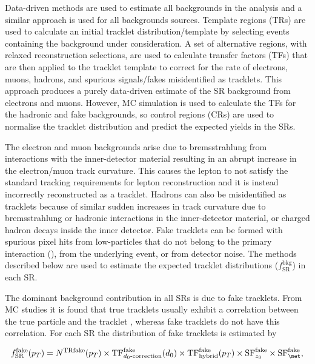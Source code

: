 Data-driven methods are used to estimate all backgrounds in the analysis and a similar approach is used for all backgrounds sources. Template regions (TRs) are used to calculate an initial tracklet \pt distribution/template by selecting events containing the background under consideration. A set of alternative regions, with relaxed reconstruction selections, are used to calculate transfer factors (TFs) that are then applied to the tracklet \pt template to correct for the rate of electrons, muons, hadrons, and spurious signals/fakes misidentified as tracklets. This approach produces a purely data-driven estimate of the SR background from electrons and muons. However, MC simulation is used to calculate the TFs for the hadronic and fake backgrounds, so control regions (CRs) are used to normalise the tracklet \pt distribution and predict the expected yields in the SRs.

The electron and muon backgrounds arise due to bremsstrahlung from interactions with the inner-detector material resulting in an abrupt increase in the electron/muon track curvature. This causes the lepton to not satisfy the standard tracking requirements for lepton reconstruction and it is instead incorrectly reconstructed as a tracklet. Hadrons can also be misidentified as tracklets because of similar sudden increases in track curvature due to bremsstrahlung or hadronic interactions in the inner-detector material, or charged hadron decays inside the inner detector. Fake tracklets can be formed with spurious pixel hits from low-\pt particles that do not belong to the primary interaction (\pileup), from the underlying event, or from detector noise. The methods described below are used to estimate the expected tracklet \pt distributions ($f_{\mathrm{SR}}^{\mathrm{bkg}}$) in each SR.

The dominant background contribution in all SRs is due to fake tracklets. From MC studies it is found that true tracklets usually exhibit a correlation between the true particle \pt and the tracklet \pt, whereas fake tracklets do not have this correlation. For each SR the \pt distribution of fake tracklets is estimated by

\begin{equation*}
f_{\mathrm{SR}}^{\mathrm{fake}}(\pt) = N^{\mathrm{TRfake}}(\pt) \times \mathrm{TF}^{\mathrm{fake}}_{d_0\textrm{-correction}}(d_0) \times \mathrm{TF}^{\mathrm{fake}}_{\mathrm{hybrid}}(\pt) \times \mathrm{SF}^{\mathrm{fake}}_{z_0} \times \mathrm{SF}^{\mathrm{fake}}_{\met},
\end{equation*}

